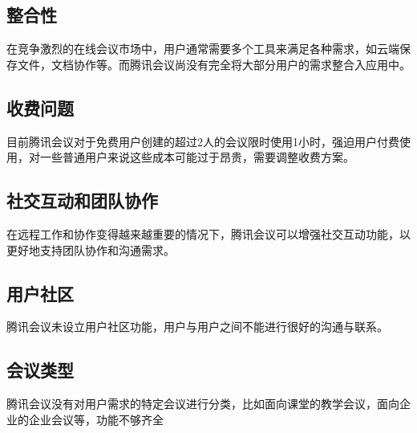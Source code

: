 \documentclass[a4paper,12pt]{article}
\begin{document}
    \subsection{整合性}
    在竞争激烈的在线会议市场中，用户通常需要多个工具来满足各种需求，如云端保存文件，文档协作等。而腾讯会议尚没有完全将大部分用户的需求整合入应用中。
    \subsection{收费问题}
    目前腾讯会议对于免费用户创建的超过2人的会议限时使用1小时，强迫用户付费使用，对一些普通用户来说这些成本可能过于昂贵，需要调整收费方案。
    \subsection{社交互动和团队协作}
    在远程工作和协作变得越来越重要的情况下，腾讯会议可以增强社交互动功能，以更好地支持团队协作和沟通需求。
    \subsection{用户社区}
    腾讯会议未设立用户社区功能，用户与用户之间不能进行很好的沟通与联系。
    \subsection{会议类型}
    腾讯会议没有对用户需求的特定会议进行分类，比如面向课堂的教学会议，面向企业的企业会议等，功能不够齐全
\end{document}
